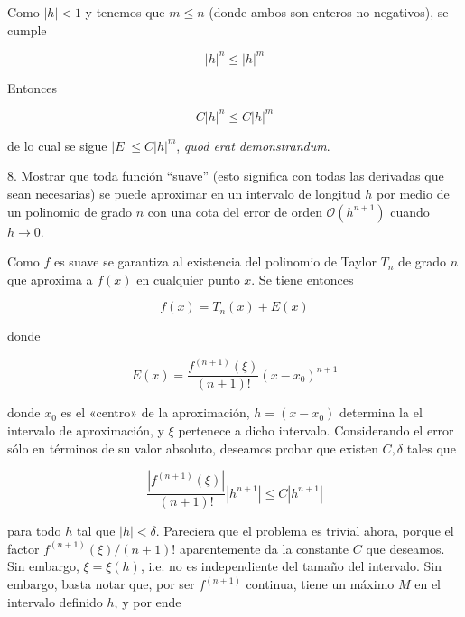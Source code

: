 \documentclass[12pt]{article}
\begin{document}
Como $\left| h \right| < 1$ y tenemos que $m \le n$ (donde ambos son enteros no
negativos), se cumple 

$$\left| h
\right|^n \le \left| h \right|^m$$

Entonces

\begin{equation*}
    C\left| h \right|^n \leq C \left| h \right|^m
\end{equation*}

de lo cual se sigue $\left| E \right| \leq C \left| h \right|^m
$, \textit{quod erat demonstrandum}.

\pagebreak 

\begin{myframe}
    8. Mostrar que toda función ``suave'' (esto significa con todas las
    derivadas que sean necesarias) se puede aproximar en un intervalo de
    longitud $h$ por medio de un polinomio de grado $n$ con una cota del error
    de orden $\mathcal{O}(h^{n+1})$ cuando $h \to 0$.
\end{myframe}

Como $f$ es suave se garantiza al existencia del polinomio de Taylor $T_n$ de
grado $n$ que aproxima a $f(x)$ en cualquier punto $x$. Se tiene entonces 

\begin{equation*}
    f(x) = T_n(x) + E(x)
\end{equation*}

donde 

\begin{equation*}
    E(x) = \frac{f^{(n+1)}(\xi)}{(n+1)!}(x-x_0)^{n+1}
\end{equation*}

donde $x_0$ es el «centro» de la aproximación, $h = (x - x_0)$ determina la el
intervalo de aproximación, y $\xi$ pertenece a dicho intervalo. Considerando el
error sólo en términos de su valor absoluto, deseamos probar que existen $C,
\delta$ tales que

\begin{equation*}
    \frac{ |f^{(n+1)}(\xi)| }{(n+1)!} |h^{n+1}| \leq C \left| h^{n+1} \right| 
\end{equation*}

para todo $h$ tal que $\left| h \right| < \delta$. Pareciera que el problema es
trivial ahora, porque el factor $f^{(n+1)}(\xi) / (n+1)!$ aparentemente da la
constante $C$ que deseamos. Sin embargo, $\xi = \xi(h)$, i.e. no es
independiente del tamaño del intervalo. Sin embargo, basta notar que, por ser
$f^{(n+1)}$ continua, tiene un máximo $M$ en el intervalo definido $h$, y por
ende
\end{document}
